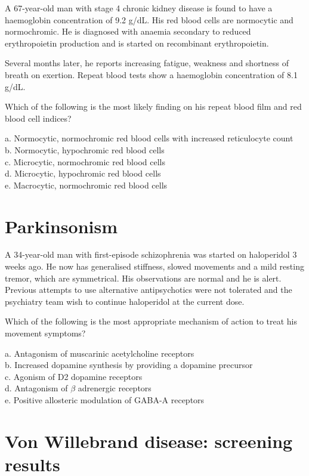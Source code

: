 \documentclass{article}
\begin{document}
A 67-year-old man with stage 4 chronic kidney disease is found to have a haemoglobin concentration of 9.2 g/dL. His red blood cells are normocytic and normochromic. He is diagnosed with anaemia secondary to reduced erythropoietin production and is started on recombinant erythropoietin.

Several months later, he reports increasing fatigue, weakness and shortness of breath on exertion. Repeat blood tests show a haemoglobin concentration of 8.1 g/dL.

Which of the following is the most likely finding on his repeat blood film and red blood cell indices?

a. Normocytic, normochromic red blood cells with increased reticulocyte count\\
b. Normocytic, hypochromic red blood cells\\
c. Microcytic, normochromic red blood cells\\
d. Microcytic, hypochromic red blood cells\\
e. Macrocytic, normochromic red blood cells

\section{Parkinsonism}

A 34-year-old man with first-episode schizophrenia was started on haloperidol 3 weeks ago. He now has generalised stiffness, slowed movements and a mild resting tremor, which are symmetrical. His observations are normal and he is alert. Previous attempts to use alternative antipsychotics were not tolerated and the psychiatry team wish to continue haloperidol at the current dose. 

Which of the following is the most appropriate mechanism of action to treat his movement symptoms? 

a. Antagonism of muscarinic acetylcholine receptors \\
b. Increased dopamine synthesis by providing a dopamine precursor \\
c. Agonism of D2 dopamine receptors \\
d. Antagonism of $\beta$ adrenergic receptors \\
e. Positive allosteric modulation of GABA-A receptors


\section{Von Willebrand disease: screening results}
\end{document}
